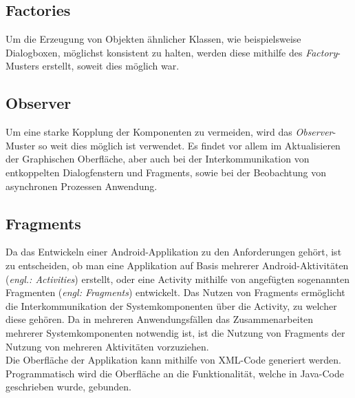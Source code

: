 \documentclass[oneside]{ausarbeitung}
\begin{document}
\subsection{Factories}
Um die Erzeugung von Objekten ähnlicher Klassen, wie beispielsweise Dialogboxen, möglichst konsistent zu halten, werden diese mithilfe des \textit{Factory}-Musters erstellt, soweit dies möglich war.

\subsection{Observer}
Um eine starke Kopplung der Komponenten zu vermeiden, wird das \textit{Observer}-Muster so weit dies möglich ist verwendet. Es findet vor allem im Aktualisieren der Graphischen Oberfläche, aber auch bei der Interkommunikation von entkoppelten Dialogfenstern und Fragments, sowie bei der Beobachtung von asynchronen Prozessen Anwendung.

\subsection{Fragments}
Da das Entwickeln einer Android-Applikation zu den Anforderungen gehört, ist zu entscheiden, ob man eine Applikation auf Basis mehrerer Android-Aktivitäten  (\textit{engl.: Activities}) erstellt, oder eine Activity mithilfe von angefügten sogenannten Fragmenten (\textit{engl: Fragments}) entwickelt. Das Nutzen von Fragments ermöglicht die Interkommunikation der Systemkomponenten über die Activity, zu welcher diese gehören. Da in mehreren Anwendungsfällen das Zusammenarbeiten mehrerer Systemkomponenten notwendig ist, ist die Nutzung von Fragments der Nutzung von mehreren Aktivitäten vorzuziehen.\\
Die Oberfläche der Applikation kann mithilfe von XML-Code generiert werden. Programmatisch wird die Oberfläche an die Funktionalität, welche in Java-Code geschrieben wurde, gebunden.\\
\end{document}
